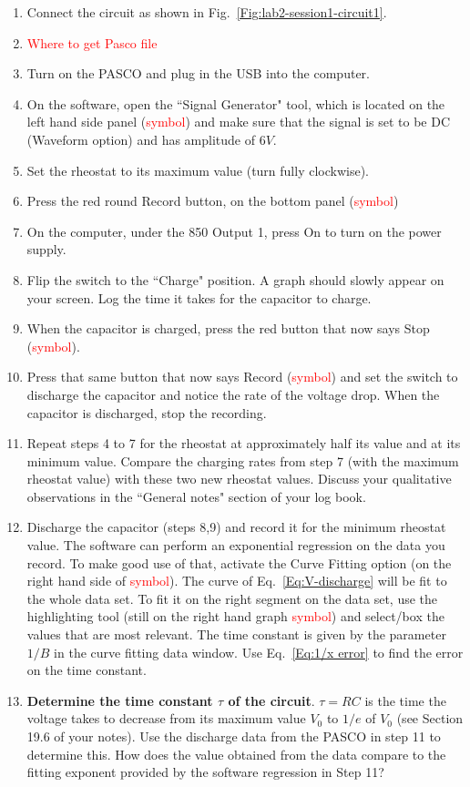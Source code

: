 \documentclass[12pt]{report}
\def \todo #1{\textcolor{red}{#1}}
\begin{document}
\begin{enumerate}
\item Connect the circuit as shown in Fig.~\ref{Fig:lab2-session1-circuit1}.
\item \todo{Where to get Pasco file}
\item Turn on the PASCO and plug in the USB into the computer.
\item On the software, open the ``Signal Generator" tool, which is located on the left hand side panel (\todo{symbol}) and make sure that the signal is set to be DC (Waveform option) and has amplitude of $6V$.
\item Set the rheostat to its maximum value (turn fully clockwise).
\item Press the red round Record button, on the bottom panel (\todo{symbol}) 
\item On the computer, under the 850 Output 1, press On to turn on the power supply.
\item Flip the switch to the ``Charge" position. A graph should slowly appear on your screen. Log the time it takes for the capacitor to charge.
\item When the capacitor is charged, press the red button that now says Stop (\todo{symbol}).
\item Press that same button that now says Record (\todo{symbol}) and set the switch to discharge the capacitor and notice the rate of the voltage drop. When the capacitor is discharged, stop the recording.
\item Repeat steps 4 to 7 for the rheostat at approximately half its value and at its minimum value. Compare the charging rates from step 7 (with the maximum rheostat value) with these two new rheostat values. Discuss your qualitative observations in the ``General notes" section of your log book.
\item Discharge the capacitor (steps 8,9) and record it for the minimum rheostat value. The software can perform an exponential regression on the data you record. To make good use of that, activate the Curve Fitting option (on the right hand side of \todo{symbol}). The curve of Eq.~\ref{Eq:V-discharge} will be fit to the whole data set. To fit it on the right segment on the data set, use the highlighting tool (still on the right hand graph \todo{symbol}) and select/box the values that are most relevant. The time constant is given by the parameter $1/B$ in the curve fitting data window. Use Eq.~\ref{Eq:1/x error} to find the error on the time constant.
\item \textbf{Determine the time constant $\tau$ of the circuit}. $\tau = RC$ is the time the voltage takes to decrease from its maximum value $V_0$ to $1/e$ of $V_0$ (see Section 19.6 of your notes). Use the discharge data from the PASCO in step 11 to determine this. How does the value obtained from the data compare to the fitting exponent provided by the software regression in Step 11?

\end{enumerate}
\end{document}
